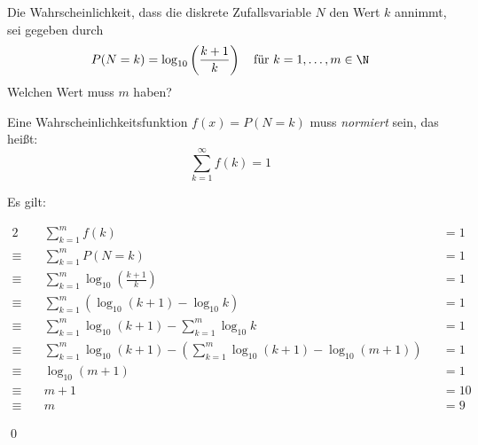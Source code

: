 \documentclass{abgabe}
\begin{document}
\begin{questions}
    \question
    Die Wahrscheinlichkeit, dass die diskrete Zufallsvariable $N$ den Wert $k$ annimmt, sei gegeben durch
    \[ 
        P(N=k) = \log_{10}\left( \frac{k+1}{k} \right) \quad \text{für} \ k = 1, \ldots, m \in \N 
    \]
    Welchen Wert muss $m$ haben? 
    \begin{solution}
        Eine Wahrscheinlichkeitsfunktion $f(x) = P(N = k)$ muss \emph{normiert} sein, das heißt: 
        \[ 
            \sum^{\infty}_{k = 1} f(k) = 1
        \]
        
        Es gilt: 
        
        \begin{alignat*}{2}
                         & \sum^{m}_{k = 1} f(k)                                                                            &  & = 1  \\ 
            \equiv \quad & \sum^{m}_{k = 1} P(N = k)                                                                        &  & = 1  \\ 
            \equiv \quad & \sum^{m}_{k = 1} \log_{10}\left( \frac{k+1}{k} \right)                                           &  & = 1  \\ 
            \equiv \quad & \sum^{m}_{k = 1} \left(\log_{10}(k+1) - \log_{10}k\right)                                        &  & = 1  \\ 
            \equiv \quad & \sum^{m}_{k = 1} \log_{10}(k+1) - \sum^{m}_{k = 1} \log_{10}k                                    &  & = 1  \\ 
            \equiv \quad & \sum^{m}_{k = 1} \log_{10}(k+1) - \left( \sum^{m}_{k = 1} \log_{10}(k+1) - \log_{10}(m+1)\right) &  & = 1  \\ 
            \equiv \quad & \log_{10}(m+1)                                                                                   &  & = 1  \\ 
            \equiv \quad & m+1                                                                                              &  & = 10 \\ 
            \equiv \quad & m                                                                                                &  & = 9 
        \end{alignat*}
        
        \qed
    \end{solution}
\end{questions}
\end{document}
